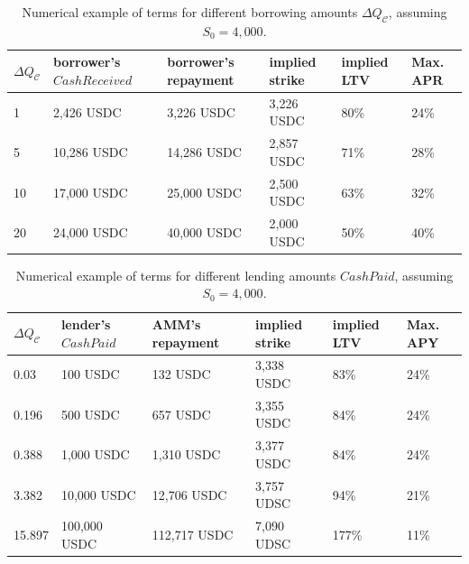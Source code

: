 \documentclass[a4paper]{article}
\begin{document}
\begin{table}[]
\small
\begin{tabular}{p{0.5cm}p{2.2cm}p{2.2cm}p{2cm}p{2cm}p{1.5cm}}
\hline
\textbf{$\Delta Q_\mathcal{C}$} & \textbf{borrower's $CashReceived$} & \textbf{borrower's repayment} & \textbf{implied strike} & \textbf{implied LTV} & \textbf{Max. APR} \\ \hline
1                     & 2,426 USDC                  & 3,226 USDC                    & 3,226 USDC              & 80\%                 & 24\%                    \\ \hline
5                     & 10,286 USDC                   & 14,286 USDC                    & 2,857 USDC              & 71\%                 & 28\%                    \\ \hline
10                    & 17,000 USDC                  & 25,000 USDC                   & 2,500 USDC              & 63\%                 & 32\%                    \\ \hline
20                    & 24,000 USDC                  & 40,000 USDC                   & 2,000 USDC              & 50\%                 & 40\%                    \\ \hline
\end{tabular}
\label{tab:example_borrowers}
\caption{Numerical example of terms for different borrowing amounts $\Delta Q_\mathcal{C}$, assuming $S_0=4,000$.}
\end{table}


\begin{table}[]
\small
\begin{tabular}{p{0.5cm}p{2.2cm}p{2.2cm}p{2cm}p{2cm}p{1.5cm}}
\hline
\textbf{$\Delta Q_\mathcal{C}$} & \textbf{lender's $CashPaid$} & \textbf{AMM's repayment} & \textbf{implied strike} & \textbf{implied LTV} & \textbf{Max. APY} \\ \hline
0.03                     & 100 USDC                   & 132 USDC             & 3,338 USDC                  & 83\%                 & 24\%                    \\ \hline
0.196                     & 500 USDC                  & 657 USDC            & 3,355 USDC              & 84\%                 & 24\%                    \\ \hline
0.388                    & 1,000 USDC                  & 1,310 USDC            & 3,377 USDC              & 84\%                 & 24\%                    \\ \hline
3.382                    & 10,000 USDC                  & 12,706 USDC            & 3,757 UDSC              & 94\%                 & 21\%                     \\ \hline
15.897                    & 100,000 USDC                  & 112,717 USDC            & 7,090 UDSC              & 177\%                 & 11\%                     \\ \hline
\end{tabular}
\caption{Numerical example of terms for different lending amounts $CashPaid$, assuming $S_0=4,000$.}
\label{tab:example_lenders}
\end{table}
\end{document}
